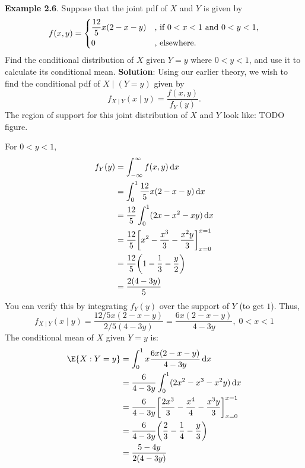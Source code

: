 \begin{Example}{}
    \textbf{Example 2.6}. Suppose that the joint pdf of $ X $ and $ Y $ is given by
    \[ f(x,y)=\begin{dcases}
            \frac{12}{5}x(2-x-y) & \text{, if $ 0<x<1 $ and $ 0<y<1 $,} \\
            0                    & \text{, elsewhere}.
        \end{dcases} \]
    Find the conditional distribution of $ X $ given $ Y=y $ where $ 0<y<1 $, and use it to calculate its conditional mean.
    \tcblower{}
    \textbf{Solution}: Using our earlier theory, we wish to find the conditional pdf of $ X\mid(Y=y) $ given by
    \[ f_{X\mid Y}(x\mid y)=\frac{f(x,y)}{f_Y(y)}. \]
    The region of support for this joint distribution of $ X $ and $ Y $ look like: TODO figure.

    For $ 0<y<1 $,
    \begin{align*}
        f_Y(y)
         & =\int_{-\infty}^{\infty}f(x,y)\odif{x}                                     \\
         & =\int_{0}^{1}\frac{12}{5} x(2-x-y)\odif{x}                                 \\
         & =\frac{12}{5} \int_{0}^{1}(2x-x^2-xy)\odif{x}                              \\
         & =\frac{12}{5} \biggl[x^2-\frac{x^3}{3} -\frac{x^2y}{3} \biggr]_{x=0}^{x=1} \\
         & =\frac{12}{5} \biggl(1-\frac{1}{3} -\frac{y}{2} \biggr)                    \\
         & =\frac{2(4-3y)}{5}
    \end{align*}
    You can verify this by integrating $ f_Y(y) $ over the support of $ Y $ (to get $1$). Thus,
    \[ f_{X\mid Y}(x\mid y)=\frac{12/5 x(2-x-y)}{2/5 (4-3y)}=\frac{6x(2-x-y)}{4-3y},\; 0<x<1 \]
    The conditional mean of $ X $ given $ Y=y $ is:
    \begin{align*}
        \E{X\given Y=y}
         & =\int_{0}^{1}x \frac{6x(2-x-y)}{4-3y} \odif{x}                                           \\
         & =\frac{6}{4-3y} \int_{0}^{1}(2x^2-x^3-x^2y)\odif{x}                                      \\
         & =\frac{6}{4-3y} \biggl[\frac{2x^3}{3} -\frac{x^4}{4} -\frac{x^3 y}{3}\biggr]_{x=0}^{x=1} \\
         & =\frac{6}{4-3y} \biggl(\frac{2}{3}-\frac{1}{4}-\frac{y}{3} \biggr)                       \\
         & =\frac{5-4y}{2(4-3y)}
    \end{align*}
\end{Example}

